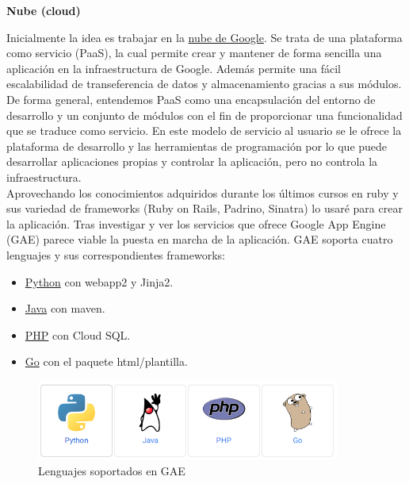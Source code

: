 \vspace*{0.3in}
\begin{LARGE}
	\textbf{{\huge Nube (cloud)}}
\end{LARGE}

\vspace*{0.1in}
Inicialmente la idea es trabajar en la \href{https://cloud.google.com/appengine/docs}{nube de Google}. Se trata de una plataforma como servicio (PaaS), la cual permite crear y mantener de forma sencilla una aplicación en la infraestructura de Google. Además permite una fácil escalabilidad de transeferencia de datos y almacenamiento gracias a sus módulos.\\

De forma general, entendemos PaaS como una encapsulación del entorno de desarrollo y un conjunto de módulos con el fin de proporcionar una funcionalidad que se traduce como servicio. En este modelo de servicio al usuario se le ofrece la plataforma de desarrollo y las herramientas de programación por lo que puede desarrollar aplicaciones propias y controlar la aplicación, pero no controla la infraestructura. \\

Aprovechando los conocimientos adquiridos durante los últimos cursos en ruby y sus variedad de frameworks (Ruby on Rails, Padrino, Sinatra) lo usaré para crear la aplicación. Tras investigar y ver los servicios que ofrece Google App Engine (GAE) parece viable la puesta en marcha de la aplicación. GAE soporta cuatro lenguajes y sus correspondientes frameworks:
\begin{itemize}
	\item \href{https://cloud.google.com/appengine/docs/python/gettingstartedpython27/introduction}{Python} con webapp2 y Jinja2.
	\item \href{https://cloud.google.com/appengine/docs/java/gettingstarted/introduction}{Java} con maven.
	\item \href{https://cloud.google.com/appengine/docs/php/gettingstarted/introduction}{PHP} con Cloud SQL.
	\item \href{https://cloud.google.com/appengine/docs/go/gettingstarted/introduction}{Go} con el paquete html/plantilla. 
\end{itemize}

\begin{figure}[H]
	\centering
		\includegraphics[width=10cm]{./images/lenguajes-GAE.png}
		\caption{Lenguajes soportados en GAE} \label{fig:lenguajes-GAE}
\end{figure}

